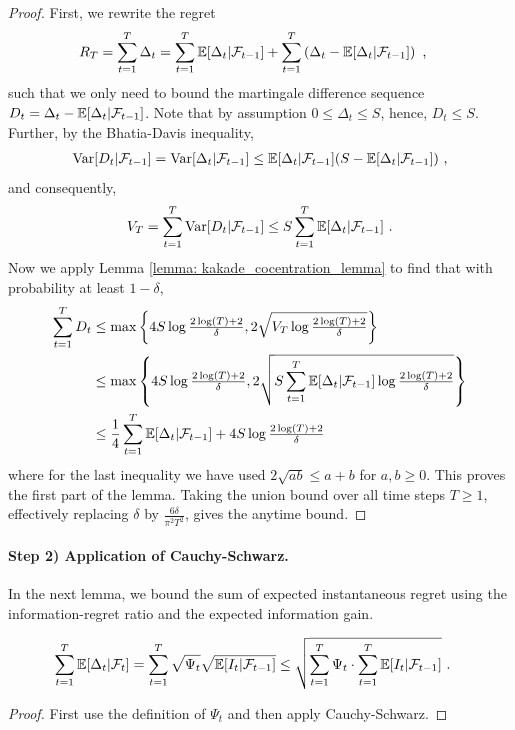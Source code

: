 \begin{proof}
	First, we rewrite the regret 
	\begin{align*}
	R_T &= \sum_{t=1}^T \Delta_t =  \sum_{t=1}^T \mathbb{E}[\Delta_t|\mathcal{F}_{t-1}] + \sum_{t=1}^T \left( \Delta_t -  \mathbb{E}[\Delta_t|\mathcal{F}_{t-1}] \right) \text{ ,}
	\end{align*}	
	such that we only need to bound the martingale difference sequence $D_t = \Delta_t -  \mathbb{E}[\Delta_t|\mathcal{F}_{t-1}]$. Note that by assumption $0 \leq \Delta_t \leq S$, hence, $D_t \leq S$. Further, by the Bhatia-Davis inequality,
	\begin{align*}
	\operatorname*{Var}[D_t|\mathcal{F}_{t-1}] = \operatorname*{Var}[\Delta_t|\mathcal{F}_{t-1}] \leq \mathbb{E}[\Delta_t |\mathcal{F}_{t-1}](S- \mathbb{E}[\Delta_t |\mathcal{F}_{t-1}]) \text{ ,}
	\end{align*}
	and consequently,
	\begin{align*}
	V_T = \sum_{t=1}^T \operatorname*{Var}[D_t|\mathcal{F}_{t-1}] \leq S \sum_{t=1}^T \mathbb{E}[\Delta_t |\mathcal{F}_{t-1}] \text{ .}
	\end{align*}
	Now we apply Lemma \ref{lemma: kakade_cocentration_lemma} to find that with probability at least $1-\delta$,
	\begin{align*}
	\sum_{t=1}^T D_t & \leq \max\left\{4S \log\tfrac{2 \log(T) + 2}{\delta}, 2 \sqrt{V_T \log \tfrac{2 \log(T) + 2}{\delta}}\right\}\\
	&\leq \max\left\{4S \log\tfrac{2 \log(T) + 2}{\delta}, 2 \sqrt{S \sum_{t=1}^T \mathbb{E}[\Delta_t | \mathcal{F}_{t-1}] \log \tfrac{2 \log(T) + 2}{\delta}}\right\}\\
	&\leq \frac{1}{4} \sum_{t=1}^T \mathbb{E}[\Delta_t | \mathcal{F}_{t-1}] + 4 S\log \tfrac{2 \log(T) + 2}{\delta}
	\end{align*}
	where for the last inequality we have used $2 \sqrt{ab}\leq a + b$ for $a,b \geq 0$. This proves the first part of the lemma. Taking the union bound over all time steps $T \geq 1$, effectively replacing $\delta$ by $\frac{6 \delta}{\pi^2 T^2}$, gives the anytime bound.
\end{proof}



\paragraph{Step 2) Application of Cauchy-Schwarz.}
In the next lemma, we bound the sum of expected instantaneous regret using the information-regret ratio and the expected information gain. 
\begin{lemma} \label{lemma: expected regret by information ratio}
	\begin{align*}
	\sum_{t=1}^T \mathbb{E}[\Delta_t|\mathcal{F}_t] &= \sum_{t=1}^T \sqrt{\Psi_t} \sqrt{\mathbb{E}[I_t |\mathcal{F}_{t-1}]} \leq \sqrt{\sum_{t=1}^T \Psi_t \cdot \sum_{t=1}^T \mathbb{E}[I_t|\mathcal{F}_{t-1}]} \text{ .}
	\end{align*}
\end{lemma}
\begin{proof}
	First use the definition of $\Psi_t$ and then apply Cauchy-Schwarz.
\end{proof}

